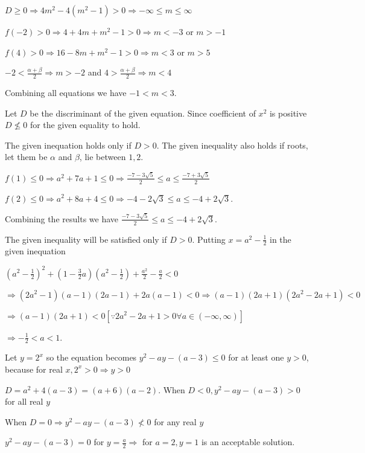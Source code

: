   $D\geq 0 \Rightarrow 4m^2 - 4\left(m^2 - 1\right) > 0 \Rightarrow -\infty\leq m\leq \infty$

  $f(-2) > 0 \Rightarrow 4 + 4m + m^2 - 1 > 0 \Rightarrow m < -3$ or $m > -1$

  $f(4) > 0\Rightarrow 16 - 8m + m^2 - 1 > 0 \Rightarrow m < 3$ or $m > 5$

  $-2<\frac{\alpha + \beta}{2}\Rightarrow m > -2$ and $4 > \frac{\alpha + \beta}{2}\Rightarrow m < 4$

  Combining all equations we have $-1 < m < 3$.
\item Let $D$ be the discriminant of the given equation. Since coefficient of $x^2$ is positive $D\nleq 0$
  for the given equality to hold.

  The given inequation holds only if $D > 0$. The given inequality also holds if roots, let them be $\alpha$
  and $\beta$, lie between $1, 2$.

  $f(1)\leq 0 \Rightarrow a^2 + 7a + 1\leq 0 \Rightarrow \frac{-7 - 3\sqrt{5}}{2}\leq  a\leq \frac{-7 +
    3\sqrt{5}}{2}$

  $f(2) \leq 0\Rightarrow a^2 + 8a + 4\leq 0 \Rightarrow -4 -2\sqrt{3}\leq a\leq -4 + 2\sqrt{3}$.

  Combining the results we have $\frac{-7 - 3\sqrt{5}}{2} \leq a\leq -4 + 2\sqrt{3}$.
\item The given inequality will be satisfied only if $D > 0$. Putting $x = a^2 - \frac{1}{2}$ in the given
  inequation

  $\left(a^2 - \frac{1}{2}\right)^2 + \left(1 - \frac{3}{2}a\right)\left(a^2 - \frac{1}{2}\right)
  + \frac{a^2}{2} - \frac{a}{2} < 0$

  $\Rightarrow \left(2a^2 - 1\right)(a - 1)(2a - 1) + 2a(a - 1) < 0\Rightarrow (a - 1)(2a + 1)\left(2a^2 -
  2a + 1\right) < 0$

  $\Rightarrow (a - 1)(2a + 1) < 0[\because 2a^2 - 2a + 1 > 0\forall a\in(-\infty, \infty)]$

  $\Rightarrow -\frac{1}{2} < a< 1$.
\item Let $y = 2^x$ so the equation becomes $y^2 - ay - (a - 3)\leq 0$ for at least one $y > 0$, because for
  real $x, 2^x > 0 \Rightarrow y > 0$

  $D = a^2 + 4(a - 3) = (a + 6)(a - 2)$. When $D < 0, y^2 - ay - (a - 3) > 0$ for all real $y$

  When $D = 0\Rightarrow y^2 - ay - (a - 3)\nless 0$ for any real $y$

  $y^2 - ay - (a - 3) = 0$ for $y = \frac{a}{2}\Rightarrow$ for $a = 2, y = 1$ is an acceptable solution.

